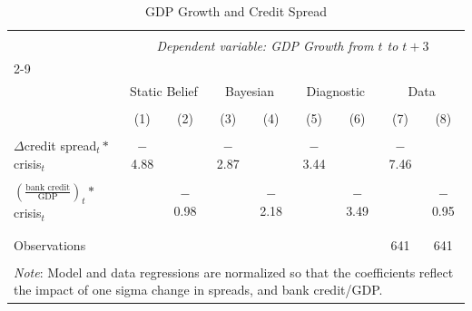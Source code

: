 
\begin{table}[!htbp] \centering 
  \caption{GDP Growth and Credit Spread} 
  \label{Severity regression on GDP Growth} 
\begin{tabular}{@{\extracolsep{0pt}}lcccccccc} 
\\[-1.8ex]\hline 
\hline \\[-1.8ex] 
 & \multicolumn{8}{c}{\textit{Dependent variable: GDP Growth from $t$ to $t+3$}} \\ 
\cline{2-9} 
\\[-1.8ex]
 & \multicolumn{2}{c}{Static Belief} & \multicolumn{2}{c}{Bayesian} & \multicolumn{2}{c}{Diagnostic} & \multicolumn{2}{c}{Data} \\ 
\\[-1.8ex] & (1) & (2) & (3) & (4) & (5) & (6) & (7) & (8)\\ 
\hline \\[-1.8ex] 
 $\Delta$credit spread$_t*$crisis$_t$ & $-$4.88 &  & $-$2.87 &  & $-$3.44 &  & $-$7.46 &  \\ 
  &  &  &  &  &  &  &  &  \\ 
  $(\frac{\text{bank credit}}{\text{GDP}})_t*$crisis$_t$ &  & $-$0.98 &  & $-$2.18 &  & $-$3.49 &  & $-$0.95 \\ 
  &  &  &  &  &  &  &  &  \\ 
 \hline \\[-1.8ex] 
Observations &  &  &  &  &  &  & 641 & 641 \\ 
\hline 
\hline \\[-1.8ex] 
\multicolumn{9}{p{0.95\textwidth}}{\footnotesize \textit{Note}: 
                                       Model and data regressions are normalized so that the coefficients reflect the impact of one sigma change in spreads, and bank credit/GDP. 
                                       }
\end{tabular} 
\end{table} 

